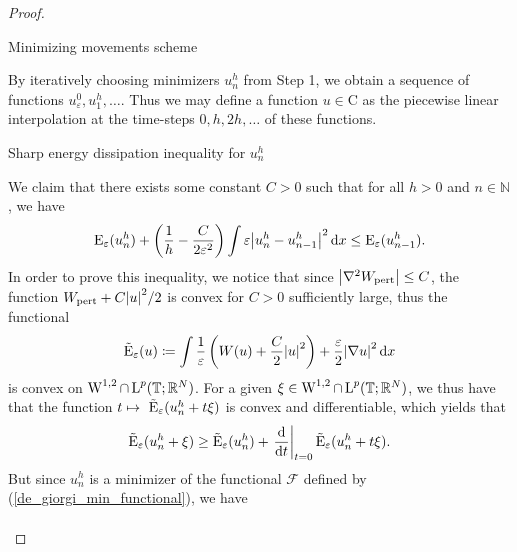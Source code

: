\begin{proof}
\begin{description}[wide=0pt]
		\item[Step 2:] Minimizing movements scheme 
		
		By iteratively choosing minimizers $ u_{ n }^{ h } $ from Step 1, we obtain a sequence of functions $ u_{ \varepsilon }^{ 0 }, u_{ 1 }^{ h } , \dotsc $. Thus we may define a function $ u \in \mathrm{ C } $ as the piecewise linear interpolation at the time-steps $ 0, h , 2h, \dotsc $ of these functions.
		
		\item[Step 3:] Sharp energy dissipation inequality for $ u_{ n }^{ h } $
		
		We claim that there exists some constant $ C > 0 $ such that for all $ h > 0 $ and $ n \in \mathbb{ N } $, we have
		\begin{equation}
			\label{discrete_optimal_energy_dissipation}
			\operatorname{E}_{ \varepsilon } ( u_{ n }^{ h } )
			+
			\left( \frac{ 1 }{ h } - \frac{ C }{ 2 \varepsilon^{ 2 } } \right)
			\int \varepsilon \abs{ u_{ n }^{ h } - u_{ n - 1 }^{ h } }^{ 2 } \dd{ x }
			\leq
			\operatorname{E}_{ \varepsilon } ( u_{ n - 1 }^{ h } ).
		\end{equation}
		In order to prove this inequality, we notice that since $ \abs{ \nabla^{ 2 } W_{ \mathrm{pert} } } \leq C $, the function $ W_{ \mathrm{pert} } + C \abs{ u }^{ 2 }/2 $ is convex for $ C > 0 $ sufficiently large, thus the functional 
		\begin{equation*}
			\tilde{\operatorname{E}}_{ \varepsilon }  ( u )
			\coloneqq
			\int 
			\frac{ 1 }{ \varepsilon }
			\left( W ( u ) + \frac{ C }{ 2 } \abs{ u }^{ 2 } \right)
			+
			\frac{ \varepsilon}{ 2 }
			\abs{ \nabla u }^{ 2 }
			\dd{ x }
		\end{equation*}
		is convex on $ \operatorname{W}^{ 1 , 2 } \cap \operatorname{L}^{ p } ( \operatorname{\mathbb{T}} ; \mathbb{ R }^{ N } ) $. For a given $ \xi \in \operatorname{W}^{ 1 , 2 } \cap \operatorname{L}^{ p } ( \operatorname{\mathbb{T}} ; \mathbb{ R }^{ N } ) $, we thus have that the function
		$ t \mapsto \ \tilde{\operatorname{E}}_{ \varepsilon } ( u_{ n }^{ h } + t \xi ) $ is convex and differentiable, which yields that
		\begin{equation}
			\label{convexity_at_time_1}
			\tilde{\operatorname{E}}_{ \varepsilon } ( u_{ n }^{ h } + \xi )
			\geq
			\tilde{\operatorname{E}}_{ \varepsilon } ( u_{ n }^{ h } ) + 
			\left.\dv{ t }\right|_{ t = 0 } \tilde{\operatorname{E}}_{ \varepsilon } ( u_{ n }^{ h } + t \xi).
		\end{equation} 
		But since $ u_{ n }^{ h } $ is a minimizer of the functional $\mathcal{ 
		F }$ defined by (\ref{de_giorgi_min_functional}), we have
		\begin{align*}

\end{align*}
\end{description}
\end{proof}

